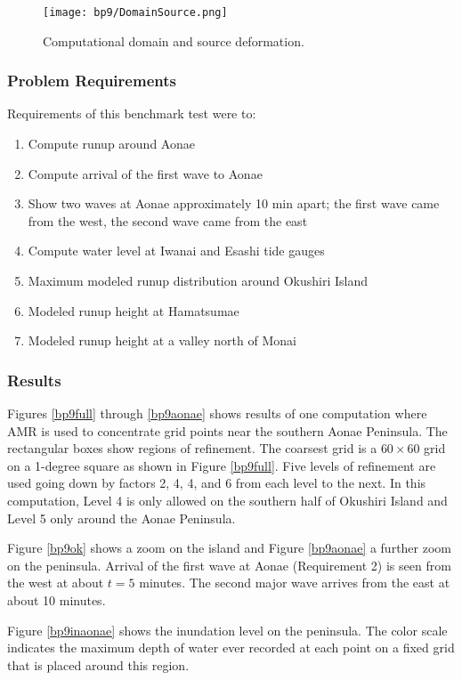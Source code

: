 \begin{figure}[ht]
\hfil\texttt{[image: bp9/DomainSource.png]}\hfil
\caption{\label{DomainSource}
Computational domain and source deformation.
  }
\end{figure} 

\subsubsection{Problem Requirements}
  Requirements of this benchmark test were to:
\begin{enumerate}
\item  Compute runup around Aonae
\item  Compute arrival of the first wave to Aonae
\item  Show two waves at Aonae approximately 10 min apart; the first wave came from the west, the second wave came from the east
\item  Compute water level at Iwanai and Esashi tide gauges
\item  Maximum modeled runup distribution around Okushiri Island
\item  Modeled runup height at Hamatsumae
\item  Modeled runup height at a valley north of Monai
\end{enumerate}

\subsubsection{Results}

Figures \ref{bp9full} through  \ref{bp9aonae} shows results of one computation where AMR is used to concentrate grid points near the southern Aonae Peninsula. The rectangular boxes show regions of refinement.  The coarsest grid is a $60\times 60$ grid on a 1-degree square as shown in Figure \ref{bp9full}. Five levels of refinement are used going down by factors 2, 4, 4, and 6 from each level to the next. In this computation, Level 4 is only allowed on the southern half of Okushiri Island and Level 5 only around the Aonae Peninsula. 

Figure \ref{bp9ok} shows a zoom on the island and Figure \ref{bp9aonae} a further zoom on the peninsula. 
Arrival of the first wave at Aonae (Requirement 2) is seen from the west at about $t = 5$ minutes.  The second major wave arrives from the east at about 10 minutes.    

Figure \ref{bp9inaonae} shows the inundation level on the peninsula.  The color scale indicates the maximum depth of water ever recorded at each point on a fixed grid that is placed around this region.  




